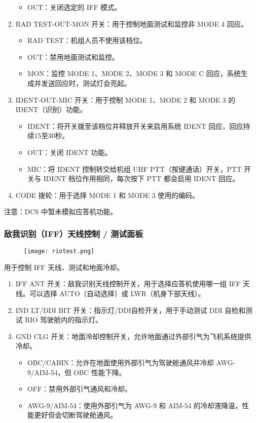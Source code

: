 \begin{enumerate}
\begin{itemize}
    \item OUT：关闭选定的 IFF 模式。
  \end{itemize}
  \item RAD TEST-OUT-MON 开关：用于控制地面测试和监控非 MODE 4 回应。
  \begin{itemize}
    \item RAD TEST：机组人员不使用该档位。
    \item OUT：禁用地面测试和监控。
    \item MON：监控 MODE 1、MODE 2、MODE 3 和 MODE C 回应，系统生成并发送回应时，测试灯会亮起。
  \end{itemize}
  \item IDENT-OUT-MIC 开关：用于控制 MODE 1、MODE 2 和 MODE 3 的 IDENT（识别）功能。
  \begin{itemize}
    \item IDENT：将开关拨至该档位并释放开关来启用系统 IDENT 回应，回应持续15至30秒。
    \item OUT：关闭 IDENT 功能。
    \item MIC：将 IDENT 控制转交给机组 UHF PTT（按键通话）开关，PTT 开关与 IDENT 档位作用相同，每次按下 PTT 都会启用 IDENT 回应。
  \end{itemize}
  \item CODE 拨轮：用于选择 MODE 1 和 MODE 3 使用的编码。
\end{enumerate}
注意：DCS 中暂未模拟应答机功能。

\subsubsection{敌我识别（IFF）天线控制 / 测试面板}
\begin{figure}[htb]
  \center
  \texttt{[image: riotest.png]}
\end{figure}
用于控制 IFF 天线、测试和地面冷却。

\begin{enumerate}
  \item IFF ANT 开关：敌我识别天线控制开关，用于选择应答机使用哪一组 IFF 天线。可以选择 AUTO（自动选择）或 LWR（机身下部天线）。
  \item IND LT/DDI BIT 开关：指示灯/DDI自检开关，用于手动测试 DDI 自检和测试 RIO 驾驶舱内的指示灯。
  \item GND CLG 开关：地面冷却控制开关，允许地面通过外部引气为飞机系统提供冷却。
  \begin{itemize}
    \item OBC/CABIN：允许在地面使用外部引气为驾驶舱通风并冷却 AWG-9/AIM-54，但 OBC 性能下降。
    \item OFF：禁用外部引气通风和冷却。
    \item AWG-9/AIM-54：使用外部引气为 AWG-9 和 AIM-54 的冷却液降温，性能更好但会切断驾驶舱通风。
  \end{itemize}
\end{enumerate}

